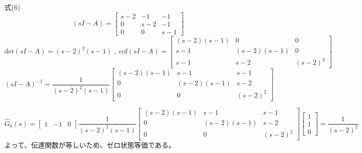 \documentclass{jsarticle}
\begin{document}
式(6)\;\;
\begin{equation}
  (sI-A) = \begin{bmatrix}
    s-2& -1& -1\\
    0  &s-2& -1\\
    0  & 0 &s-1
  \end{bmatrix}
\end{equation}
\begin{equation}
  \text{det}(sI-A) = (s-2)^2(s-1) \;,\;
  \text{cof}(sI-A) = \begin{bmatrix}
    (s-2)(s-1)& 0 & 0\\
    s-1&(s-2)(s-1)& 0\\
    s-1 &s-2&(s-2)^2
  \end{bmatrix} 
\end{equation}
\begin{equation}
  {(sI-A)}^{-1} = \frac{1}{(s-2)^2(s-1)}
  \begin{bmatrix}
    (s-2)(s-1)& s-1 & s-1\\
    0&(s-2)(s-1)&s-2\\
    0 &0&(s-2)^2
  \end{bmatrix}
\end{equation}



\begin{equation}
  \hat{G}_6(s) = 
  \begin{bmatrix}
    1&-1&0
  \end{bmatrix}
  \frac{1}{(s-2)^2(s-1)}
  \begin{bmatrix}
    (s-2)(s-1)& s-1 & s-1\\
    0&(s-2)(s-1)&s-2\\
    0 &0&(s-2)^2
  \end{bmatrix}
  \begin{bmatrix}
    1\\1\\0
  \end{bmatrix}
  = \frac{1}{(s-2)^2}
\end{equation}
よって、伝達関数が等しいため、ゼロ状態等価である。\\
\newpage
\end{document}
